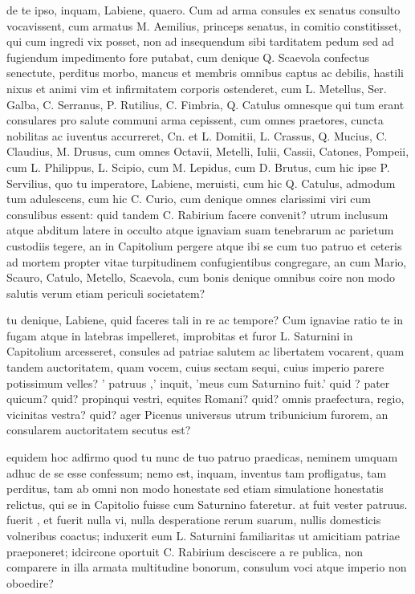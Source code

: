  de te ipso, inquam, Labiene, quaero. Cum ad arma consules ex senatus consulto vocavissent, cum armatus M. Aemilius, princeps senatus, in comitio constitisset, qui cum ingredi vix posset, non ad insequendum sibi tarditatem pedum sed ad fugiendum impedimento fore putabat, cum denique Q. Scaevola confectus senectute, perditus morbo, mancus et membris omnibus captus ac debilis, hastili nixus et animi vim et infirmitatem corporis ostenderet, cum L. Metellus, Ser. Galba, C. Serranus, P. Rutilius, C. Fimbria, Q. Catulus omnesque qui tum erant consulares pro salute communi arma cepissent, cum omnes praetores, cuncta nobilitas ac iuventus accurreret, Cn. et L. Domitii, L. Crassus, Q. Mucius, C. Claudius, M. Drusus, cum omnes Octavii, Metelli, Iulii, Cassii, Catones, Pompeii, cum L. Philippus, L. Scipio, cum M. Lepidus, cum D. Brutus, cum hic ipse P. Servilius, quo tu imperatore, Labiene, meruisti, cum hic Q. Catulus, admodum tum adulescens, cum hic C. Curio, cum denique omnes clarissimi viri cum consulibus essent: quid tandem C. Rabirium facere convenit? utrum inclusum atque abditum latere in occulto atque ignaviam suam tenebrarum ac parietum custodiis tegere, an in Capitolium pergere atque ibi se cum tuo patruo et ceteris ad mortem propter vitae turpitudinem confugientibus congregare, an cum Mario, Scauro, Catulo, Metello, Scaevola, cum bonis denique omnibus coire non modo salutis verum etiam periculi societatem?

 tu denique, Labiene, quid faceres tali in re ac tempore? Cum ignaviae ratio te in fugam atque in latebras impelleret, improbitas et furor L. Saturnini in Capitolium arcesseret, consules ad patriae salutem ac libertatem vocarent, quam tandem auctoritatem, quam vocem, cuius sectam sequi, cuius imperio parere potissimum velles? ' patruus ,' inquit, 'meus cum Saturnino fuit.' quid ? pater quicum? quid? propinqui vestri, equites Romani? quid? omnis praefectura, regio, vicinitas vestra? quid? ager Picenus universus utrum tribunicium furorem, an consularem auctoritatem secutus est?

 equidem hoc adfirmo quod tu nunc de tuo patruo praedicas, neminem umquam adhuc de se esse confessum; nemo est, inquam, inventus tam profligatus, tam perditus, tam ab omni non modo honestate sed etiam simulatione honestatis relictus, qui se in Capitolio fuisse cum Saturnino fateretur. at fuit vester patruus. fuerit , et fuerit nulla vi, nulla desperatione rerum suarum, nullis domesticis volneribus coactus; induxerit eum L. Saturnini familiaritas ut amicitiam patriae praeponeret; idcircone oportuit C. Rabirium desciscere a re publica, non comparere in illa armata multitudine bonorum, consulum voci atque imperio non oboedire?

